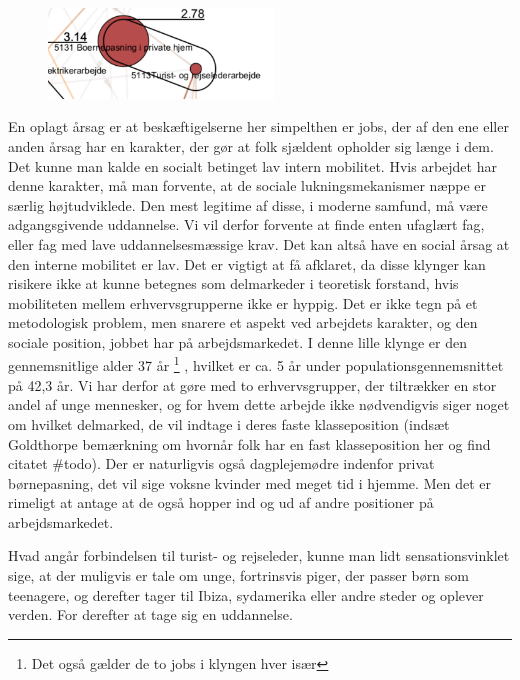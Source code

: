 %
\begin{figure}
  \vspace{-20pt}
  \begin{center}
    \includegraphics[width=6cm]{fig/segzoom/seg_2_78_internmob.pdf}
   \caption{}
   \label{fig_delanalyse1_zoom_2_78}
  \end{center}
  \vspace{-20pt}
\end{figure}
%

En oplagt årsag er at beskæftigelserne her simpelthen er jobs, der af den ene eller anden årsag har en karakter, der gør at folk sjældent opholder sig længe i dem. Det kunne man kalde en socialt betinget lav intern mobilitet. Hvis arbejdet har denne karakter, må man forvente, at de sociale lukningsmekanismer næppe er særlig højtudviklede. Den mest legitime af disse, i moderne samfund, må være adgangsgivende uddannelse. Vi vil derfor forvente at finde enten ufaglært fag, eller fag med lave uddannelsesmæssige krav. Det kan altså have en social årsag at den interne mobilitet er lav. Det er vigtigt at få afklaret, da disse klynger kan risikere ikke at kunne betegnes som delmarkeder i teoretisk forstand, hvis mobiliteten mellem erhvervsgrupperne ikke er hyppig. Det er ikke tegn på et metodologisk problem, men snarere et aspekt ved arbejdets karakter, og den sociale position, jobbet har på arbejdsmarkedet. I denne lille klynge er den gennemsnitlige alder 37 år%
%
\footnote{ Det også gælder de to jobs i klyngen hver især}%
%
, hvilket er ca. 5 år under populationsgennemsnittet på 42,3 år. Vi har derfor at gøre med to erhvervsgrupper, der tiltrækker en stor andel af unge mennesker, og for hvem dette arbejde ikke nødvendigvis siger noget om hvilket delmarked, de vil indtage i deres faste klasseposition (indsæt Goldthorpe bemærkning om hvornår folk har en fast klasseposition her og find citatet \#todo). Der er naturligvis også dagplejemødre indenfor privat børnepasning, det vil sige voksne kvinder med meget tid i hjemme. Men det er rimeligt at antage at de også hopper ind og ud af andre positioner på arbejdsmarkedet. 

Hvad angår forbindelsen til turist- og rejseleder, kunne man lidt sensationsvinklet sige, at der muligvis er tale om unge, fortrinsvis piger, der passer børn som teenagere, og derefter tager til Ibiza, sydamerika eller andre steder og oplever verden. For derefter at tage sig en uddannelse.

